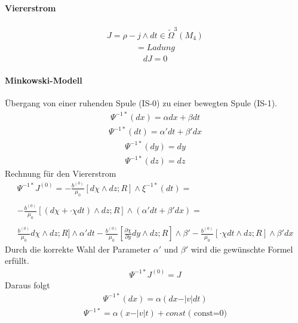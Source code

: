 \documentclass[10pt,a4paper]{article}
\begin{document}
\paragraph{Viererstrom} $\, $ \\
\begin{align}
J= \rho -j \wedge dt \in \tilde{\Omega}^3 (M_4)
\end{align}
\begin{align}
[J]= Ladung
\end{align}
\begin{align}
dJ=0
\end{align}
\paragraph{Minkowski-Modell} $\,$\\
Übergang von einer ruhenden Spule (IS-0) zu einer bewegten Spule (IS-1).
\begin{align}
\Psi^{-1*} (dx)= \alpha dx + \beta dt
\end{align}
\begin{align}
\Psi^{-1*} (dt) = \alpha' dt + \beta' dx
\end{align}
\begin{align}
\Psi^{-1*} (dy)= dy
\end{align}
\begin{align}
\Psi^{-1*} (dz)= dz
\end{align}
Rechnung für den Viererstrom
\begin{align}
\Psi^{-1*} J^{(0)} = - \frac{b^{(0)}}{\mu_0} [d \chi \wedge dz ; R] \wedge \xi^{-1*} (dt) = \\
\\ -\frac{b^{(0)}}{\mu_0} [(d \chi + \cdot{\chi} dt) \wedge dz ;R] \wedge ( \alpha' dt + \beta' dx ) = \\
\\ \frac{b^{(0)}}{\mu_0}  d \chi \wedge dz ; R ] \wedge \alpha' dt - \frac{b^{(0)}}{\mu_0} [ \frac{ \partial \chi}{\partial y} dy \wedge dz ; R ] \wedge \beta' - \frac{b^{(0)}}{\mu_0} [\cdot{\chi} dt \wedge dz ;R] \wedge \beta' dx
\end{align}
Durch die korrekte Wahl der Parameter $ \alpha' $ und $ \beta ' $ wird die gewünschte Formel erfüllt.
\begin{align}
\Psi^{-1*} J^{(0)} = J
\end{align}
Daraus folgt
\begin{align}
\Psi^{-1*} (dx) = \alpha (dx- \vert v \vert dt) 
\end{align}
\begin{align}
\Psi^{-1*}= \alpha ( x - \vert v \vert t ) + const \;\text{( const=0)}
\end{align}
\end{document}
